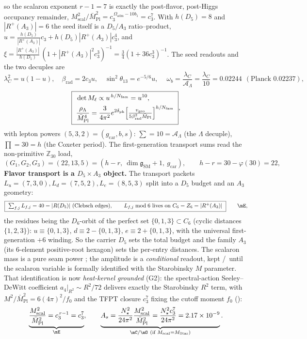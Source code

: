\documentclass[11pt,a4paper]{article}
\newcommand{\Mbar}{\bar M_{\mathrm{Pl}}}
\newcommand{\gcar}{g_{\mathrm{car}}}
\newcommand{\Nfam}{N_{\mathrm{fam}}}
\newcommand{\Oadm}{\Omega_{\mathrm{adm}}}
\newcommand{\cthree}{c_3}
\newcommand{\useed}{u}
\newcommand{\dph}{\delta_{\mathrm{ph}}}
\newcommand{\betarad}{\beta_{\mathrm{rad}}}
\newcommand{\lC}{\lambda_C}
\newcommand{\AL}{\mathcal A_\Lambda}
\newcommand{\dimg}{\dim\mathfrak g_{\mathrm{SM}}}
\theoremstyle{definition}
\begin{document}
so the scalaron exponent $r-1=7$ is exactly the post-flavor, post-Higgs occupancy remainder,
$M_{\mathrm{scal}}^2/\Mbar^2=\cthree^{\,\Oadm-10b_1}=\cthree^7$. With $h(D_5)=8$ and $|R^+(A_3)|=6$
the seed itself is a $D_5/A_3$ ratio--product, $\useed=\tfrac{h(D_5)}{|R^+(A_3)|}\cthree+h(D_5)|R^+(A_3)|\cthree^4$,
and $\xi=\tfrac{|R^+(A_3)|}{h(D_5)}\,(1+|R^+(A_3)|^2\cthree^3)^{-1}=\tfrac34(1+36\cthree^3)^{-1}$.
The seed readouts and the two decuples are
\begin{equation}
  \lC^2=\useed(1-\useed),\quad \betarad=2\cthree\useed,\quad \sin^2\theta_{13}=e^{-5/6}\useed,\quad
  \boxed{\ \omega_b=\frac{\lC}{\AL}=\frac{\lC}{10}=0.02244\ }\ (\text{Planck }0.02237),
\end{equation}
\begin{equation}
  \boxed{\ \begin{aligned}
    &\det M_\ell\propto\useed^{\,h/\Nfam}=\useed^{10},\\
    &\frac{\rho_\Lambda}{\Mbar^4}=\frac{3}{4\pi^2}e^{2\dph}\Bigl[\tfrac{v_{\mathrm{geo}}}{5\betarad^2\Mbar}\Bigr]^{h/\Nfam}
  \end{aligned}\ },
\end{equation}
with lepton powers $(5,3,2)=(\gcar,b,s)$: $\sum=10=\AL$ (the $\Lambda$ decuple), $\prod=30=h$ (the
Coxeter period). The first-generation transport sums read the non-primitive $\mathbb Z_{30}$ load,
\begin{equation}
  (G_1,G_2,G_3)=(22,13,5)=(h-r,\ \dimg+1,\ \gcar),\qquad h-r=30-\varphi(30)=22 ,
\end{equation}
\textbf{Flavor transport is a $D_5\times A_3$ object.} The transport packets
$L_u{=}(7,3,0),L_d{=}(7,5,2),L_e{=}(8,5,3)$ split into a $D_5$ budget and an $A_3$ geometry:
\begin{equation}
  \boxed{\ \textstyle\sum_{f,j}L_{f,j}=40=|R(D_5)|\ (\text{Clebsch edges}),\qquad
  L_{f,j}\bmod 6\ \text{lives on}\ C_6=Z_6=|R^+(A_3)|\ }\qquad\mE ,
\end{equation}
the residues being the $D_6$-orbit of the perfect set $\{0,1,3\}\subset C_6$ (cyclic distances
$\{1,2,3\}$): $u\!\equiv\!\{0,1,3\}$, $d\!\equiv\!2{-}\{0,1,3\}$, $e\!\equiv\!2{+}\{0,1,3\}$, with the
universal first-generation $+6$ winding. So the carrier $D_5$ sets the total budget and the family
$A_3$ (its $6$-element positive-root hexagon) sets the per-entry distances.
The scalaron mass is a pure seam power \mE; the amplitude is a \emph{conditional} readout, kept
\mC/\mO\ until the scalaron variable is formally identified with the Starobinsky $M$ parameter. That
identification is now \emph{heat-kernel grounded} (G2): the spectral-action Seeley--DeWitt coefficient
$a_4|_{R^2}\!\sim\!R^2/72$ delivers exactly the Starobinsky $R^2$ term, with $M^2/\Mbar^2=6(4\pi)^2/f_0$ and
the TFPT closure $\cthree^7$ fixing the cutoff moment $f_0$ ():
\begin{equation}
  \underbrace{\frac{M_{\mathrm{scal}}^2}{\Mbar^2}=\cthree^{\,r-1}=\cthree^7}_{\mE},\qquad
  \underbrace{A_s=\frac{N_\star^2}{24\pi^2}\frac{M_{\mathrm{scal}}^2}{\Mbar^2}=\frac{N_\star^2\cthree^7}{24\pi^2}=2.17\times10^{-9}}_{\mC/\mO\ (\text{if }M_{\mathrm{scal}}=M_{\mathrm{Star}})} .
\end{equation}
\end{document}
